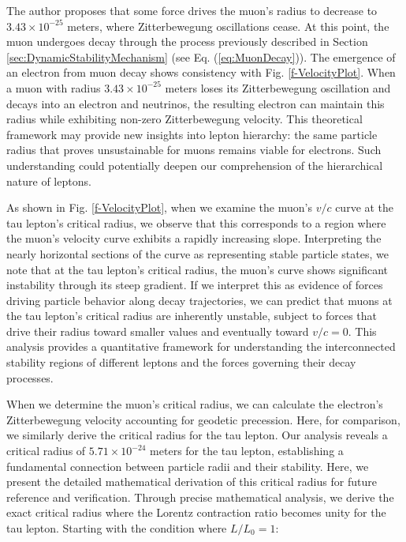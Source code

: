 \documentclass[%
 reprint,
 amsmath,amssymb,
 aps,
]{revtex4-1}
\numberwithin{equation}{section}%
\begin{document}
The author proposes that some force drives the muon's radius to decrease to $3.43 \times 10^{-25}$ meters, where Zitterbewegung oscillations cease. At this point, the muon undergoes decay through the process previously described in Section \ref{sec:DynamicStabilityMechanism} (see Eq. (\ref{eq:MuonDecay})). The emergence of an electron from muon decay shows consistency with Fig. \ref{f-VelocityPlot}. When a muon with radius $3.43 \times 10^{-25}$ meters loses its Zitterbewegung oscillation and decays into an electron and neutrinos, the resulting electron can maintain this radius while exhibiting non-zero Zitterbewegung velocity. This theoretical framework may provide new insights into lepton hierarchy: the same particle radius that proves unsustainable for muons remains viable for electrons. Such understanding could potentially deepen our comprehension of the hierarchical nature of leptons.

As shown in Fig. \ref{f-VelocityPlot}, when we examine the muon's $v/c$ curve at the tau lepton's critical radius, we observe that this corresponds to a region where the muon's velocity curve exhibits a rapidly increasing slope. Interpreting the nearly horizontal sections of the curve as representing stable particle states, we note that at the tau lepton's critical radius, the muon's curve shows significant instability through its steep gradient. If we interpret this as evidence of forces driving particle behavior along decay trajectories, we can predict that muons at the tau lepton's critical radius are inherently unstable, subject to forces that drive their radius toward smaller values and eventually toward $v/c = 0$. This analysis provides a quantitative framework for understanding the interconnected stability regions of different leptons and the forces governing their decay processes.

When we determine the muon's critical radius, we can calculate the electron's Zitterbewegung velocity accounting for geodetic precession. Here, for comparison, we similarly derive the critical radius for the tau lepton. Our analysis reveals a critical radius of $5.71 \times 10^{-24}$ meters for the tau lepton, establishing a fundamental connection between particle radii and their stability. Here, we present the detailed mathematical derivation of this critical radius for future reference and verification. Through precise mathematical analysis, we derive the exact critical radius where the Lorentz contraction ratio becomes unity for the tau lepton. Starting with the condition where $L/L_0 = 1$:
\end{document}
